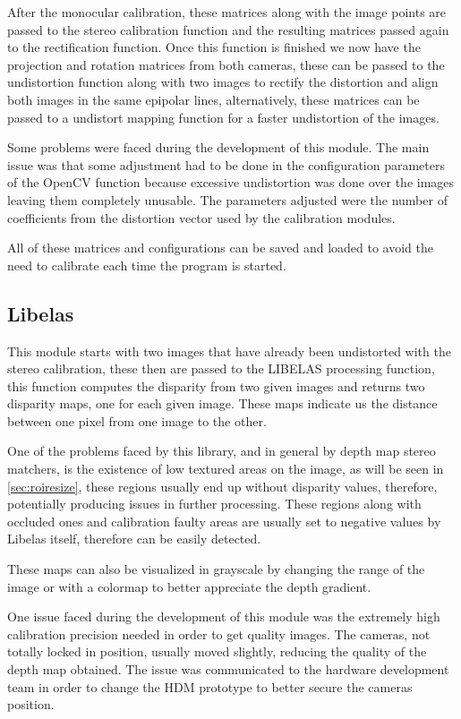 \documentclass[10pt,a4paper,twocolumn,twoside]{article}
\begin{document}
	After the monocular calibration, these matrices along with the image points are passed to the stereo calibration function and the resulting matrices passed again to the rectification function. Once this function is finished we now have the projection and rotation matrices from both cameras, these can be passed to the undistortion function along with two images to rectify the distortion and align both images in the same epipolar lines, alternatively, these matrices can be passed to a undistort mapping function for a faster undistortion of the images.  
	
	Some problems were faced during the development of this module. The main issue was that some adjustment had to be done in the configuration parameters of the OpenCV function because excessive undistortion was done over the images leaving them completely unusable. The parameters adjusted were the number of coefficients from the distortion vector used by the calibration modules. 
	
	All of these matrices and configurations can be saved and loaded to avoid the need to calibrate each time the program is started.  
	
	\subsection{Libelas}
	 This module starts with two images that have already been undistorted with the stereo calibration, these then are passed to the LIBELAS processing function, this function computes the disparity from two given images and returns two disparity maps, one for each given image. These maps indicate us the distance between one pixel from one image to the other.  
	 
	 One of the problems faced by this library, and in general by depth map stereo matchers, is the existence of low textured areas on the image, as will be seen in \ref{sec:roiresize}, these regions usually end up without disparity values, therefore, potentially producing issues in further processing. These regions along with occluded ones and calibration faulty areas are usually set to negative values by Libelas itself, therefore can be easily detected.  
	 
	 These maps can also be visualized in grayscale by changing the range of the image or with a colormap to better appreciate the depth gradient. 
	 
	 One issue faced during the development of this module was the extremely high calibration precision needed in order to get quality images. The cameras, not totally locked in position, usually moved slightly, reducing the quality of the depth map obtained. The issue was communicated to the hardware development team in order to change the HDM prototype to better secure the cameras position.  
	 
\end{document}
